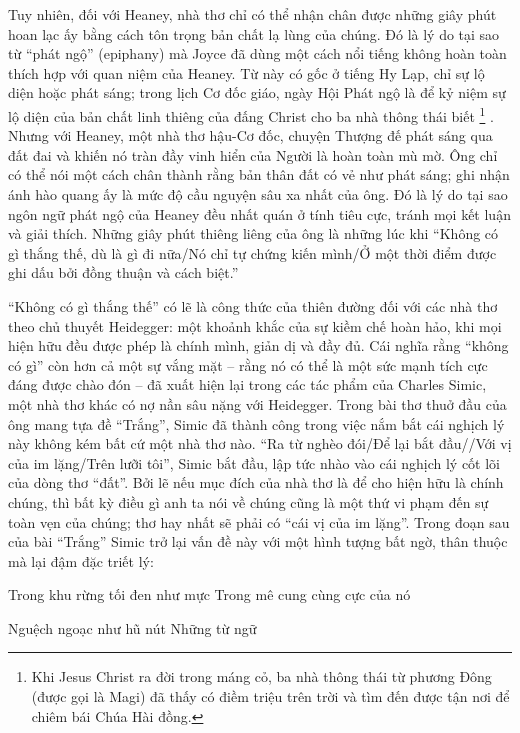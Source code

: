 \documentclass[../main.tex]{subfiles}
\begin{document}
\begin{multicols}{2}
Tuy nhiên, đối với Heaney, nhà thơ chỉ có thể nhận chân được những giây phút hoan lạc ấy bằng cách tôn trọng bản chất lạ lùng của chúng. Đó là lý do tại sao từ “phát ngộ” (epiphany) mà Joyce đã dùng một cách nổi tiếng không hoàn toàn thích hợp với quan niệm của Heaney. Từ này có gốc ở tiếng Hy Lạp, chỉ sự lộ diện hoặc phát sáng; trong lịch Cơ đốc giáo, ngày Hội Phát ngộ là để kỷ niệm sự lộ diện của bản chất linh thiêng của đấng Christ cho ba nhà thông thái biết \footnote{
Khi Jesus Christ ra đời trong máng cỏ, ba nhà thông thái từ phương Đông (được gọi là Magi) đã thấy có điềm triệu trên trời và tìm đến được tận nơi để chiêm bái Chúa Hài đồng.} . Nhưng với Heaney, một nhà thơ hậu-Cơ đốc, chuyện Thượng đế phát sáng qua đất đai và khiến nó tràn đầy vinh hiển của Người là hoàn toàn mù mờ. Ông chỉ có thể nói một cách chân thành rằng bản thân đất có vẻ như phát sáng; ghi nhận ánh hào quang ấy là mức độ cầu nguyện sâu xa nhất của ông. Đó là lý do tại sao ngôn ngữ phát ngộ của Heaney đều nhất quán ở tính tiêu cực, tránh mọi kết luận và giải thích. Những giây phút thiêng liêng của ông là những lúc khi “Không có gì thắng thế, dù là gì đi nữa/Nó chỉ tự chứng kiến mình/Ở một thời điểm được ghi dấu bởi đồng thuận và cách biệt.” 

“Không có gì thắng thế” có lẽ là công thức của thiên đường đối với các nhà thơ theo chủ thuyết Heidegger: một khoảnh khắc của sự kiềm chế hoàn hảo, khi mọi hiện hữu đều được phép là chính mình, giản dị và đầy đủ. Cái nghĩa rằng “không có gì” còn hơn cả một sự vắng mặt – rằng nó có thể là một sức mạnh tích cực đáng được chào đón – đã xuất hiện lại trong các tác phẩm của Charles Simic, một nhà thơ khác có nợ nần sâu nặng với Heidegger. Trong bài thơ thuở đầu của ông mang tựa đề “Trắng”, Simic đã thành công trong việc nắm bắt cái nghịch lý này không kém bất cứ một nhà thơ nào. “Ra từ nghèo đói/Để lại bắt đầu//Với vị của im lặng/Trên lưỡi tôi”, Simic bắt đầu, lập tức nhào vào cái nghịch lý cốt lõi của dòng thơ “đất”. Bởi lẽ nếu mục đích của nhà thơ là để cho hiện hữu là chính chúng, thì bất kỳ điều gì anh ta nói về chúng cũng là một thứ vi phạm đến sự toàn vẹn của chúng; thơ hay nhất sẽ phải có “cái vị của im lặng”. Trong đoạn sau của bài “Trắng” Simic trở lại vấn đề này với một hình tượng bất ngờ, thân thuộc mà lại đậm đặc triết lý: 
\begin{blockquote}


Trong khu rừng tối đen như mực 
Trong mê cung cùng cực của nó 

Nguệch ngoạc như hũ nút 
Những từ ngữ 


\end{blockquote}
\end{multicols}
\end{document}
